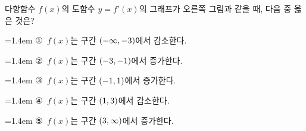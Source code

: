 \noindent\begin{minipage}[t]{0.58\linewidth}\vspace{0pt}\raggedright 다항함수 $f(x)$의 도함수 $y=f'(x)$의 그래프가 오른쪽 그림과 같을 때, 다음 중 옳은 것은?\end{minipage}\hfill\begin{minipage}[t]{0.4\linewidth}\vspace{0pt}\centering \resizebox{\ifdim\width>\linewidth\linewidth\else\width\fi}{!}{}\end{minipage}\par
\par\medskip\par\noindent\hangindent=1.4em {\small ①}\ $f(x)$는 구간 $(-\infty{,}\mkern3mu\mathopen{}-3)$에서 감소한다.\par\noindent\hangindent=1.4em {\small ②}\ $f(x)$는 구간 $(-3{,}\mkern3mu\mathopen{}-1)$에서 증가한다.\par\noindent\hangindent=1.4em {\small ③}\ $f(x)$는 구간 $(-1{,}\mkern3mu\mathopen{}1)$에서 증가한다.\par\noindent\hangindent=1.4em {\small ④}\ $f(x)$는 구간 $(1{,}\mkern3mu\mathopen{}3)$에서 감소한다.\par\noindent\hangindent=1.4em {\small ⑤}\ $f(x)$는 구간 $(3{,}\mkern3mu\mathopen{}\infty)$에서 증가한다.\par\medskip
